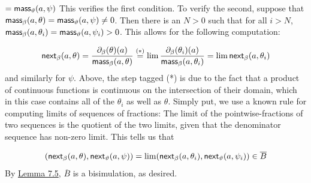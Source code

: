 \hypertarget{html:S7.Ex11}{}   %
\hypertarget{html:S7.Ex11.m1}{}\({\displaystyle=\mbox{\sf mass}_{\vartheta}(a,\psi)}\)    This verifies the first condition. To verify the second, suppose that %
\hypertarget{html:S7.SS0.SSS0.P0.SPx7.p2.m8}{}\({\mbox{\sf mass}_{\beta}(a,\theta)=\mbox{\sf mass}_{\vartheta}(a,\psi)\neq 0}\). Then there is an %
\hypertarget{html:S7.SS0.SSS0.P0.SPx7.p2.m9}{}\({N>0}\) such that for all %
\hypertarget{html:S7.SS0.SSS0.P0.SPx7.p2.m10}{}\({i>N}\), %
\hypertarget{html:S7.SS0.SSS0.P0.SPx7.p2.m11}{}\({\mbox{\sf mass}_{\beta}(a,\theta_{i})=\mbox{\sf mass}_{\vartheta}(a,\psi_{i})>0}\). This allows for the following computation:
\par\medskip
\hypertarget{html:S7.Ex12}{}   %
\hypertarget{html:S7.Ex12.m1}{}\[\mbox{\sf next}_{\beta}(a,\theta)=\frac{\partial_{\beta}(\theta)(a)}{\mbox{\sf
mass}_{\beta}(a,\theta)}\overset{(*)}{=}\lim\frac{\partial_{\beta}(\theta_{i})(a)}{\mbox{\sf mass}_{\beta}(a,\theta_{i})}=\lim\mbox{\sf next}_{\beta}(a,\theta_{i})\]    and similarly for %
\hypertarget{html:S7.SS0.SSS0.P0.SPx7.p2.m12}{}\({\psi}\). Above, the step tagged (*) is due to the fact that a product of continuous functions is continuous on the intersection of their domain, which in this case contains all of the %
\hypertarget{html:S7.SS0.SSS0.P0.SPx7.p2.m13}{}\({\theta_{i}}\) as well as %
\hypertarget{html:S7.SS0.SSS0.P0.SPx7.p2.m14}{}\({\theta}\). Simply put, we use a known rule for computing limits of sequences of fractions: The limit of the pointwise-fractions of two sequences is the quotient of the two limits, given that the denominator sequence has non-zero limit. This tells us that
\par\medskip
\hypertarget{html:S7.Ex13}{}   %
\hypertarget{html:S7.Ex13.m1}{}\[(\mbox{\sf next}_{\beta}(a,\theta),\mbox{\sf next}_{\vartheta}(a,\psi))=\lim(\mbox{\sf next}_{\beta}(a,\theta_{i}),\mbox{\sf next}_{\vartheta}(a,\psi_{i}))\in\overline{B}\]    By \hyperlink{html:S7.Thmtheorem5}{Lemma 7.5}, %
\hypertarget{html:S7.SS0.SSS0.P0.SPx7.p2.m15}{}\({\overline{B}}\) is a bisimulation, as desired. %
